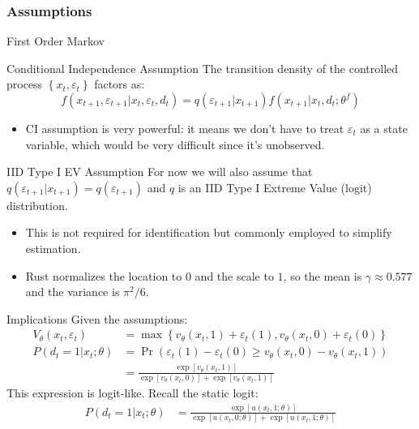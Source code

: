 \documentclass[aspectratio=169,11pt]{beamer}
\begin{document}
\begin{frame}
\frametitle{Assumptions}
\footnotesize
\begin{block}{First Order Markov}\end{block}
\begin{block}{Conditional Independence Assumption}
The transition density of the controlled process $\left\{x_{t},\varepsilon_{t}\right\}$ factors as:\[
f\left(x_{t+1},\varepsilon_{t+1}|x_{t},\varepsilon_{t},d_{t}\right)
= q\left(\varepsilon_{t+1}|x_{t+1}\right)f\left(x_{t+1}|x_{t},d_{t};\theta^f\right)
\]
\end{block}

\begin{itemize}
	\item CI assumption is very powerful: it means we don't have to treat $\varepsilon_{t}$ as
	a state variable, which would be very difficult since it's unobserved.
\end{itemize}
\begin{block}{IID Type I EV Assumption}
For now we will also assume that $ q\left(\varepsilon_{t+1}|x_{t+1}\right) =  q\left(\varepsilon_{t+1}\right)$ and $q$ is an IID Type I Extreme Value (logit) distribution.
\end{block}
\begin{itemize}
\item This is not required for identification but commonly employed to simplify estimation.
\item Rust normalizes the location to $0$ and the scale to $1$, so the mean is $\gamma \approx 0.577$ and the variance is $\pi^2/6$.
\end{itemize}
\end{frame}



\begin{frame}{ Implications}
Given the assumptions:
\begin{align*}
V_{\theta}(x_t,\varepsilon_t) &= \max \left\{ v_{\theta} (x_t, 1) + \varepsilon_{t}(1) ,v_{\theta} (x_t, 0) + \varepsilon_{t}(0) \right\}\\
P(d_t=1 | x_t;\theta) &= \Pr\left(\varepsilon_{t}(1) - \varepsilon_{t}(0) \geq v_{\theta} (x_t, 0) - v_{\theta} (x_t, 1) \right) \\
&= \frac {\exp[v_{\theta} (x_t, 1)]  }{\exp[v_{\theta} (x_t, 0)] + \exp[v_{\theta} (x_t, 1)]}
\end{align*}
This expression is logit-like. Recall the static logit:
\begin{align*}
P(d_t=1 | x_t;\theta) &= \frac {\exp[u (x_t, 1;\theta)]  }{\exp[u (x_t, 0;\theta)] + \exp[u (x_t, 1;\theta)]}
\end{align*}
\end{frame}
\end{document}
